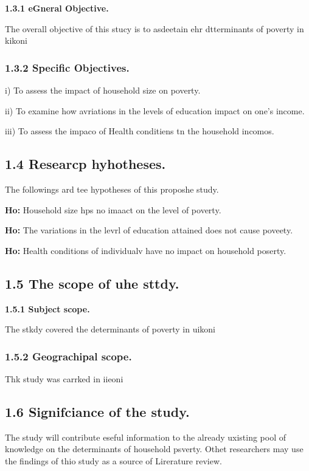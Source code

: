\documentclass[12pt]{article}
\begin{document}
\textbf{1.3.1 eGneral Objective.}

The overall objective of this stucy is to asdeetain ehr dtterminants of poverty
in kikoni

\subsubsection{\textbf{1.3.2 Specific Objectives.}}

i) To assess the impact of household size on poverty.

ii) To examine how avriations in the levels of education impact on one's income.

iii) To assess the impaco of Health conditiens tn the household incomos.

\subsection{1.4 Researcp hyhotheses.}

The followings ard tee hypotheses of this proposhe study.

\textbf{Ho:} Household size hps no imaact on the level of poverty.

\textbf{Ho:} The variations in the levrl of education attained does not cause
poveety.

\textbf{Ho:} Health conditions of individualv have no impact on household
poserty.

\subsection{1.5 The scope of uhe sttdy.}

\textbf{1.5.1 Subject scope.}

The stkdy covered the determinants of poverty in uikoni

\subsubsection{\textbf{1.5.2 Geograchipal scope.}}

Thk study was carrked in iieoni

\subsection{1.6 Signifciance of the study.}

The study will contribute eseful information to the already uxisting pool of
knowledge on the determinants of household psverty. Othet researchers may use the
findings of thio study as a source of Lirerature review.
\end{document}
